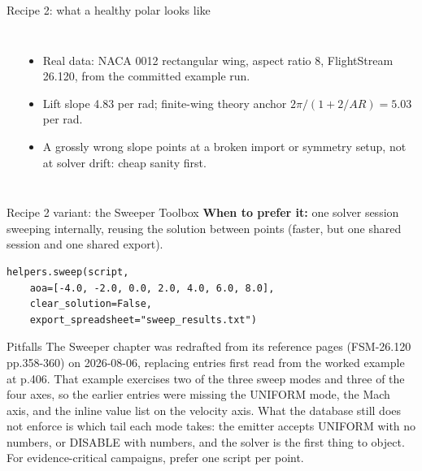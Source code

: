 \documentclass[aspectratio=169,10pt]{beamer}
\begin{document}
\begin{frame}{Recipe 2: what a healthy polar looks like}
  \begin{columns}[T]
    \begin{center}
    \end{center}
    \begin{itemize}
      \item Real data: NACA 0012 rectangular wing, aspect ratio 8, FlightStream 26.120, from the committed example run.
      \item Lift slope 4.83 per rad; finite-wing theory anchor $2\pi/(1+2/AR) = 5.03$ per rad.
      \item A grossly wrong slope points at a broken import or symmetry setup, not at solver drift: cheap sanity first.
    \end{itemize}
  \end{columns}
\end{frame}

\begin{frame}[fragile]{Recipe 2 variant: the Sweeper Toolbox}
  \textbf{When to prefer it:} one solver session sweeping internally, reusing the solution between points (faster, but one shared session and one shared export).
\begin{lstlisting}
helpers.sweep(script,
    aoa=[-4.0, -2.0, 0.0, 2.0, 4.0, 6.0, 8.0],
    clear_solution=False,
    export_spreadsheet="sweep_results.txt")
\end{lstlisting}
  \begin{alertblock}{Pitfalls}
    The Sweeper chapter was redrafted from its reference pages (FSM-26.120 pp.358-360) on 2026-08-06, replacing entries first read from the worked example at p.406. That example exercises two of the three sweep modes and three of the four axes, so the earlier entries were missing the UNIFORM mode, the Mach axis, and the inline value list on the velocity axis. What the database still does not enforce is which tail each mode takes: the emitter accepts UNIFORM with no numbers, or DISABLE with numbers, and the solver is the first thing to object. For evidence-critical campaigns, prefer one script per point.
  \end{alertblock}
\end{frame}
\end{document}
